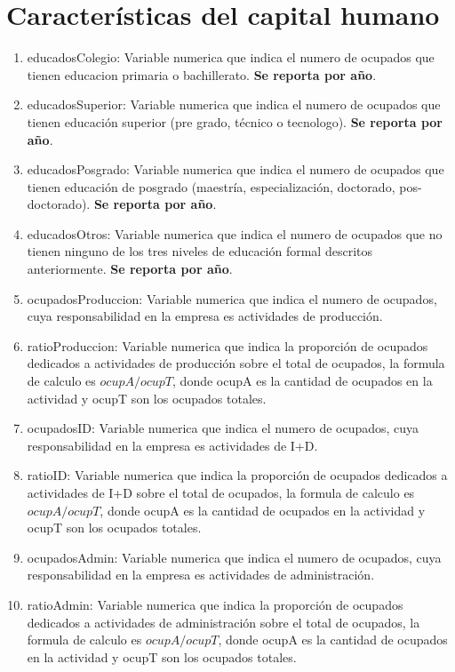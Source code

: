 \documentclass[12pt,a4paper]{article}
\begin{document}
\section{Características del capital humano}

\begin{enumerate}
	\item educadosColegio: Variable numerica que indica el numero de ocupados que tienen educacion primaria o bachillerato. \textbf{Se reporta por año}.
	\item educadosSuperior: Variable numerica que indica el numero de ocupados que tienen educación superior (pre grado, técnico o tecnologo).  \textbf{Se reporta por año}.
	\item educadosPosgrado: Variable numerica que indica el numero de ocupados que tienen educación de posgrado (maestría, especialización, doctorado, pos-doctorado).  \textbf{Se reporta por año}.
	\item educadosOtros: Variable numerica que indica el numero de ocupados que no tienen ninguno de los tres niveles de educación formal descritos anteriormente. \textbf{Se reporta por año}.
	\item ocupadosProduccion: Variable numerica que indica el numero de ocupados, cuya responsabilidad en la empresa es actividades de producción. 
	\item ratioProduccion: Variable numerica que indica la proporción de ocupados dedicados a actividades de producción sobre el total de ocupados, la formula de calculo es $ ocupA / ocupT $, donde ocupA es la cantidad de ocupados en la actividad y ocupT son los ocupados totales.
	\item ocupadosID: Variable numerica que indica el numero de ocupados, cuya responsabilidad en la empresa es actividades de I+D. 
	\item ratioID: Variable numerica que indica la proporción de ocupados dedicados a actividades de I+D sobre el total de ocupados, la formula de calculo es $ ocupA / ocupT $, donde ocupA es la cantidad de ocupados en la actividad y ocupT son los ocupados totales.
	\item ocupadosAdmin: Variable numerica que indica el numero de ocupados, cuya responsabilidad en la empresa es actividades de administración. 
	\item ratioAdmin: Variable numerica que indica la proporción de ocupados dedicados a actividades de administración sobre el total de ocupados, la formula de calculo es $ ocupA / ocupT $, donde ocupA es la cantidad de ocupados en la actividad y ocupT son los ocupados totales.

\end{enumerate}
\end{document}

